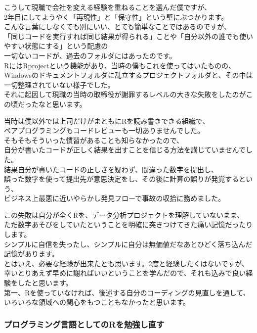 \documentclass[
  letterpaper,
  DIV=11,
  numbers=noendperiod]{scrartcl}
\begin{document}
こうして現職で会社を変える経験を重ねることを選んだ僕ですが、\\
2年目にしてようやく「再現性」と「保守性」という壁にぶつかります。\\
こんな言葉にしなくても別にいい、とても簡単なことではあるのですが、\\
「同じコードを実行すれば同じ結果が得られる」ことや「自分以外の誰でも使いやすい状態にする」という配慮の\\
一切ないコードが、過去のフォルダにはあったのです。\\
RにはRprojectという機能があり、当時の僕もこれを使ってはいたものの、\\
Windowsのドキュメントフォルダに乱立するプロジェクトフォルダと、その中は一切整理されていない様子でした。\\
それに起因して現職の当時の取締役が謝罪するレベルの大きな失敗をしたのがこの頃だったなと思います。

当時は僕以外では上司だけがまともにRを読み書きできる組織で、\\
ペアプログラミングもコードレビューも一切ありませんでした。\\
そもそもそういった慣習があることも知らなかったので、\\
自分が書いたコードが正しく結果を出すことを信じる方法を講じていませんでした。\\
結果自分が書いたコードの正しさを疑わず、間違った数字を提出し、\\
誤った数字を使って提出先が意思決定をし、その後に計算の誤りが発覚するという、\\
ビジネス上最悪に近いやらかし発見フローで事故の収拾に務めました。

この失敗は自分が全くRを、データ分析プロジェクトを理解していないまま、\\
ただ数字あそびをしていたということを明確に突きつけてきた痛い記憶だったりします。\\
シンプルに自信を失ったし、シンプルに自分は無価値だなあとひどく落ち込んだ記憶があります。\\
とはいえ、必要な経験が出来たとも思います。2度と経験したくはないですが、\\
幸いとりあえず早めに謝ればいいということを学んだので、それも込みで良い経験をしたと思います。\\
第一、Rを使っていなければ、後述する自分のコーディングの見直しを通して、\\
いろいろな領域への関心をもつこともなかったと思います。

\hypertarget{ux30d7ux30edux30b0ux30e9ux30dfux30f3ux30b0ux8a00ux8a9eux3068ux3057ux3066ux306erux3092ux52c9ux5f37ux3057ux76f4ux3059}{%
\subsubsection{プログラミング言語としてのRを勉強し直す}\label{ux30d7ux30edux30b0ux30e9ux30dfux30f3ux30b0ux8a00ux8a9eux3068ux3057ux3066ux306erux3092ux52c9ux5f37ux3057ux76f4ux3059}}
\end{document}

